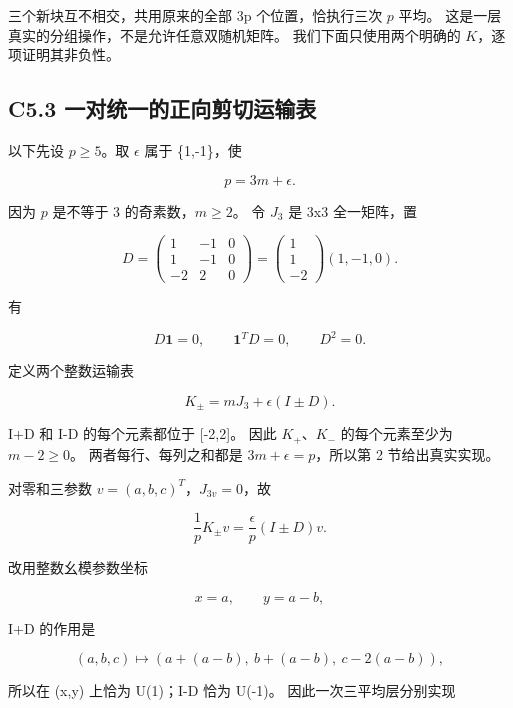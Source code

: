 \documentclass[11pt,a4paper]{article}
\theoremstyle{definition}
\numberwithin{equation}{section}
\begin{document}
{三个新块互不相交，共用原来的全部} {3p} {个位置，恰执行三次} {\ensuremath{p}} {平均。} {这是一层真实的分组操作，不是允许任意双随机矩阵。} {我们下面只使用两个明确的} {\ensuremath{K}，逐项证明其非负性。}

\subsection*{\texorpdfstring{{C5.3} {一对统一的正向剪切运输表}}{C5.3 一对统一的正向剪切运输表}}\label{C5-h29}

{以下先设} {\ensuremath{p\ge 5}。取} {\ensuremath{\epsilon }} {属于} {\{1,-1\}，使}

\[
p=3m+\epsilon.
\]

{因为} {\ensuremath{p}} {是不等于} {3} {的奇素数，\ensuremath{m\ge 2}。} {令} {\ensuremath{J_{3}}} {是} {3x3} {全一矩阵，置}

\[
D=\begin{pmatrix}
1&-1&0\\
1&-1&0\\
-2&2&0
\end{pmatrix}
=\begin{pmatrix}1\\1\\-2\end{pmatrix}(1,-1,0).
\]

{有}

\[
D\mathbf1=0,\qquad\mathbf1^TD=0,\qquad D^2=0.
\]

{定义两个整数运输表}

\[
\boxed{K_\pm=mJ_3+\epsilon(I\pm D).}
\tag{C5.1}
\]

{I+D} {和} {I-D} {的每个元素都位于} {{[}-2,2{]}。} {因此} {\ensuremath{K_+}、\ensuremath{K_-}} {的每个元素至少为} {\ensuremath{m-2\ge 0}。} {两者每行、每列之和都是} {\ensuremath{3m+\epsilon =p}，所以第} {2} {节给出真实实现。}

{对零和三参数} {\ensuremath{v=(a,b,c)^T}，\ensuremath{J_{3v}=0}，故}

\[
\frac1pK_\pm v=\frac\epsilon p(I\pm D)v.
\tag{C5.2}
\]

{改用整数幺模参数坐标}

\[
x=a,\qquad y=a-b,
\]

{I+D} {的作用是}

\[
(a,b,c)\mapsto(a+(a-b),\ b+(a-b),\ c-2(a-b)),
\]

{所以在} {(x,y)} {上恰为} {U(1)；I-D} {恰为} {U(-1)。} {因此一次三平均层分别实现}
\end{document}
